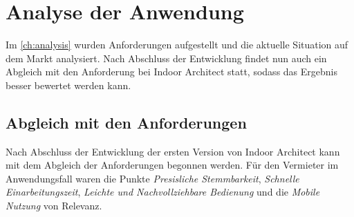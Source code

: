 
\section{Analyse der Anwendung}
Im \autoref{ch:analysis} wurden Anforderungen aufgestellt und die aktuelle Situation auf dem Markt analysiert.
Nach Abschluss der Entwicklung findet nun auch ein Abgleich mit den Anforderung bei Indoor Architect statt, sodass das Ergebnis besser bewertet werden kann.

\subsection{Abgleich mit den Anforderungen}
Nach Abschluss der Entwicklung der ersten Version von Indoor Architect kann mit dem Abgleich der Anforderungen begonnen werden.
Für den Vermieter im Anwendungsfall waren die Punkte \emph{Presisliche Stemmbarkeit}, \emph{Schnelle Einarbeitungszeit}, \emph{Leichte und Nachvollziehbare Bedienung} und die \emph{Mobile Nutzung} von Relevanz.
